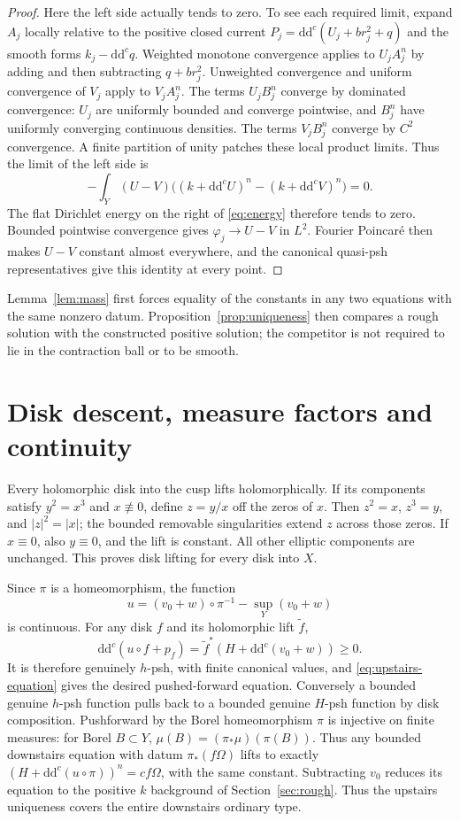 \documentclass[11pt]{article}
\newcommand{\ddc}{\mathrm{d}\mathrm{d}^c}
\newcommand{\Om}{\Omega}
\begin{document}
\begin{proof}
Here the left side actually tends to zero. To see each required limit,
expand $A_j$ locally relative to the positive closed current
$P_j=\ddc(U_j+br_j^2+q)$ and the smooth forms
$k_j-\ddc q$. Weighted monotone convergence applies to
$U_jA_j^n$ by adding and then subtracting $q+br_j^2$.
Unweighted convergence and uniform convergence of $V_j$ apply to
$V_jA_j^n$. The terms $U_jB_j^n$ converge by dominated convergence:
$U_j$ are uniformly bounded and converge pointwise, and $B_j^n$
have uniformly converging continuous densities. The terms $V_jB_j^n$
converge by $C^2$ convergence. A finite partition of unity patches
these local product limits. Thus the limit of the left side is
\[
 -\int_Y(U-V)\big((k+\ddc U)^n-(k+\ddc V)^n\big)=0.
\]
The flat Dirichlet energy on the right of \eqref{eq:energy} therefore
tends to zero. Bounded pointwise convergence gives
$\varphi_j\to U-V$ in $L^2$. Fourier Poincar\'e then makes
$U-V$ constant almost everywhere, and the canonical quasi-psh
representatives give this identity at every point.
\end{proof}

Lemma~\ref{lem:mass} first forces equality of the constants in any
two equations with the same nonzero datum. Proposition~\ref{prop:uniqueness}
then compares a rough solution with the constructed positive solution;
the competitor is not required to lie in the contraction ball or to be smooth.

\section{Disk descent, measure factors and continuity}

Every holomorphic disk into the cusp lifts holomorphically. If its
components satisfy $y^2=x^3$ and $x\not\equiv0$, define $z=y/x$ off
the zeros of $x$. Then $z^2=x$, $z^3=y$, and $|z|^2=|x|$;
the bounded removable singularities extend $z$ across those zeros.
If $x\equiv0$, also $y\equiv0$, and the lift is constant.
All other elliptic components are unchanged. This proves disk lifting
for every disk into $X$.

Since $\pi$ is a homeomorphism, the function
\[
 u=(v_0+w)\circ\pi^{-1}-\sup_Y(v_0+w)
\]
is continuous. For any disk $f$ and its holomorphic lift $\widetilde f$,
\[
 \ddc(u\circ f+p_f)
 =\widetilde f^*(H+\ddc(v_0+w))\ge0.
\]
It is therefore genuinely $h$-psh, with finite canonical values, and
\eqref{eq:upstairs-equation} gives the desired pushed-forward equation.
Conversely a bounded genuine $h$-psh function pulls back to a bounded
genuine $H$-psh function by disk composition. Pushforward by the Borel
homeomorphism $\pi$ is injective on finite measures: for Borel $B\subset Y$,
$\mu(B)=(\pi_*\mu)(\pi(B))$. Thus any bounded downstairs equation
with datum $\pi_*(f\Om)$ lifts to exactly
$(H+\ddc(u\circ\pi))^n=cf\Om$, with the same constant.
Subtracting $v_0$ reduces
its equation to the positive $k$ background of Section~\ref{sec:rough}.
Thus the upstairs uniqueness covers the entire downstairs ordinary type.
\end{document}
